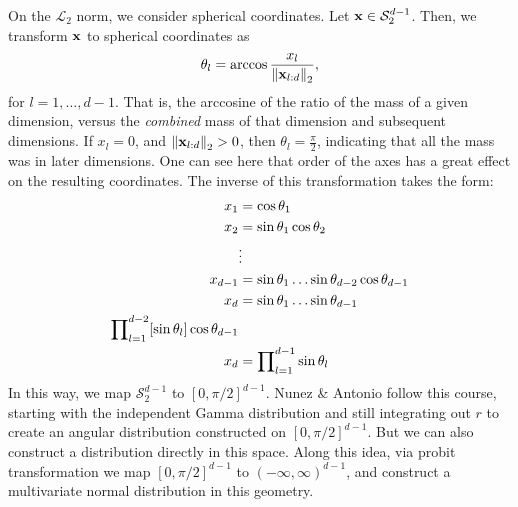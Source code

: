 On the $\mathcal{L}_2$ norm, we consider spherical coordinates.  Let ${\bf x} \in \mathcal{S}_{2}^{d-1}$.
  Then, we transform ${\bf x}$ to spherical coordinates as
  \begin{equation*}
    \theta_l = \arccos\frac{x_l}{\left\lVert {\bf x}_{l:d} \right\rVert_{2}},
  \end{equation*}
  for $l = 1,\ldots, d-1$. That is, the arccosine of the ratio of the mass of a given dimension,
  versus the \emph{combined} mass of that dimension and subsequent dimensions.  If $x_l = 0$, and
  $\left\lVert {\bf x}_{l:d} \right\rVert_{2} > 0$, then $\theta_l = \frac{\pi}{2}$, indicating that all the mass was
  in later dimensions.  One can see here that order of the axes has a great effect on the resulting
  coordinates.  The inverse of this transformation takes the form:
  \begin{equation}
    \begin{aligned}
      x_1 &= \cos\theta_1\\
      x_2 &= \sin\theta_1\cos\theta_2\\
      &\vdots\\
      x_{d-1} &= \sin\theta_1\ldots\sin\theta_{d-2}\cos\theta_{d-1}\\
      x_d &= \sin\theta_1\ldots\sin\theta_{d-1}\\
      {\small \prod}_{l = 1}^{d-2}[\sin\theta_{l}]\cos\theta_{d-1}\\
      x_d &= {\small \prod}_{l = 1}^{d-1}\sin\theta_l
    \end{aligned}
  \end{equation}
  In this way, we map $\mathcal{S}_2^{d-1}$ to $[0,\pi/2]^{d-1}$. Nunez \& Antonio\cite{nunez2019}
  follow this course, starting with the independent Gamma distribution and still integrating out
  $r$ to create an angular distribution constructed on $[0,\pi/2]^{d-1}$. But we can also construct
  a distribution directly in this space.  Along this idea, via probit transformation we map
  $[0,\pi/2]^{d-1}$ to $(-\infty, \infty)^{d-1}$, and construct a multivariate normal distribution
  in this geometry.

